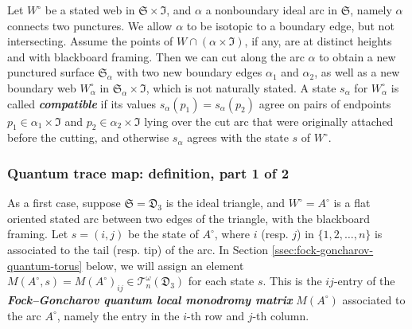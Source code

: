\documentclass[12pt,
	]{amsart}
\theoremstyle{definition}
\newcommand{\mcal}[1]{\mathcal{#1}}
\newcommand{\mfrak}[1]{\mathfrak{#1}}
\newcommand{\define}[1]{{\textit{\textbf{#1}}}}
\newcommand{\unbased}[1]{#1^\circ}
\newcommand{\surf}{\mfrak{S}}
\newcommand{\intt}{\mfrak{I}}
\newcommand{\ttriang}{\mfrak{D}_3}
\newcommand{\wroot}{\omega}
\newcommand{\qtorus}[1]{\mcal{T}_n^\wroot(#1)}
\begin{document}
Let $\unbased{W}$ be a stated web in $\surf\times\intt$, and $\alpha$ a nonboundary ideal arc in $\surf$, namely $\alpha$ connects two punctures.  We allow $\alpha$ to be isotopic to a boundary edge, but not intersecting.  Assume the points of $W\cap(\alpha\times\intt)$, if any, are at distinct heights and with blackboard framing.  Then we can cut along the arc $\alpha$ to obtain a new punctured surface $\surf_\alpha$ with two new boundary edges $\alpha_1$ and $\alpha_2$, as well as a new boundary web $\unbased{W}_\alpha$ in $\surf_\alpha\times\intt$, which is not naturally stated.  A state $s_\alpha$ for $\unbased{W}_\alpha$ is called \define{compatible} if its values $s_{\alpha}(p_1)=s_{\alpha}(p_2)$ agree on pairs of endpoints $p_1\in\alpha_1\times\intt$ and $p_2\in\alpha_2\times\intt$ lying over the cut arc that were originally attached before the cutting, and otherwise $s_\alpha$ agrees with the state $s$ of $\unbased{W}$.  

\subsubsection{Quantum trace map:  definition, part 1 of 2}\label{sssec:definition-of-the-quantum-trace-map}

As a first case, suppose $\surf=\ttriang$ is the ideal triangle, and $\unbased{W}=\unbased{A}$ is a flat oriented stated arc between two edges of the triangle, with the blackboard framing.  Let $s=(i,j)$ be the state of $\unbased{A}$, where $i$ (resp. $j$) in $\{1,2,\dots,n\}$ is associated to the tail (resp. tip) of the arc.  In Section \ref{ssec:fock-goncharov-quantum-torus} below, we will assign an element $M(\unbased{A},s)=M(\unbased{A})_{ij}\in\qtorus{\ttriang}$ for each state $s$.  This is the $ij$-entry of the \define{Fock--Goncharov quantum local monodromy matrix} $M(\unbased{A})$ associated to the arc $\unbased{A}$, namely the entry in the $i$-th row and $j$-th column.  
\end{document}
